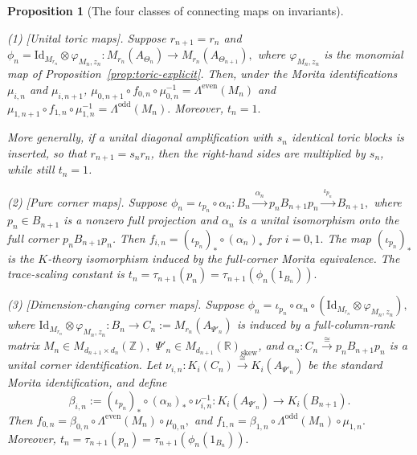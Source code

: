 \documentclass[11pt]{amsart}
\newtheorem{proposition}[theorem]{Proposition}
\theoremstyle{definition}
\theoremstyle{remark}
\newcommand{\Z}{\mathbb{Z}}
\newcommand{\R}{\mathbb{R}}
\newcommand{\id}{\mathrm{Id}}
\begin{document}
\begin{proposition}[The four classes of connecting maps on invariants]
\label{prop:four-cases-invariants}
\leavevmode


\smallskip

\noindent
 
\emph{(1) [Unital toric maps].}
Suppose $r_{n+1}=r_n$ and $\phi_n=\id_{M_{r_n}}\otimes \varphi_{M_n,z_n}
:
M_{r_n}(A_{\Theta_n})\longrightarrow M_{r_n}(A_{\Theta_{n+1}}),$
where $\varphi_{M_n,z_n}$ is the monomial map of
Proposition~\ref{prop:toric-explicit}. Then, under the Morita identifications
$\mu_{i,n}$ and $\mu_{i,n+1}$, $\mu_{0,n+1}\circ f_{0,n}\circ \mu_{0,n}^{-1}=\Lambda^{\mathrm{even}}(M_n)$
and $\mu_{1,n+1}\circ f_{1,n}\circ \mu_{1,n}^{-1}=\Lambda^{\mathrm{odd}}(M_n).$
Moreover, $t_n=1.$

More generally, if a unital diagonal amplification with \(s_n\) identical
toric blocks is inserted, so that \(r_{n+1}=s_nr_n\), then the right-hand sides
are multiplied by \(s_n\), while still \(t_n=1\).
\smallskip

\noindent
 
\emph{(2) [Pure corner maps].}
Suppose $\phi_n=\iota_{p_n}\circ \alpha_n:
B_n\xrightarrow{\ \alpha_n\ }p_nB_{n+1}p_n
\xrightarrow{\ \iota_{p_n}\ }B_{n+1},$
where \(p_n\in B_{n+1}\) is a nonzero full projection and
\(\alpha_n\) is a unital isomorphism onto the full corner \(p_nB_{n+1}p_n\).
Then $f_{i,n}=(\iota_{p_n})_*\circ(\alpha_n)_*$ for $i=0,1.$
The map $(\iota_{p_n})_*$ is the $K$-theory isomorphism induced by the
full-corner Morita equivalence. The trace-scaling constant is
$t_n=\tau_{n+1}(p_n)=\tau_{n+1}(\phi_n(1_{B_n})).$
\smallskip

\noindent


\emph{(3) [Dimension-changing corner maps].}
Suppose $\phi_n=\iota_{p_n}\circ\alpha_n\circ
(\id_{M_{r_n}}\otimes\varphi_{M_n,z_n}),$
where $\id_{M_{r_n}}\otimes\varphi_{M_n,z_n} : B_n\longrightarrow C_n:=M_{r_n}(A_{\Psi'_n})$
is induced by a full-column-rank matrix $M_n\in M_{d_{n+1}\times d_n}(\Z),$ $\Psi'_n\in M_{d_{n+1}}(\R)_{\mathrm{skew}}$,
and $\alpha_n:C_n\xrightarrow{\cong}p_nB_{n+1}p_n$
is a unital corner identification. Let $\nu_{i,n}\colon K_i(C_n)\xrightarrow{\cong}K_i(A_{\Psi'_n})$
be the standard Morita identification, and define
\[
\beta_{i,n}:=(\iota_{p_n})_*\circ(\alpha_n)_*\circ \nu_{i,n}^{-1}:K_i(A_{\Psi'_n})\longrightarrow K_i(B_{n+1}).
\]
Then $f_{0,n}=\beta_{0,n}\circ \Lambda^{\mathrm{even}}(M_n)\circ \mu_{0,n},$
and $f_{1,n}=\beta_{1,n}\circ \Lambda^{\mathrm{odd}}(M_n)\circ \mu_{1,n}.$
Moreover, $t_n=\tau_{n+1}(p_n)=\tau_{n+1}(\phi_n(1_{B_n})).$
\smallskip


\end{proposition}
\end{document}

